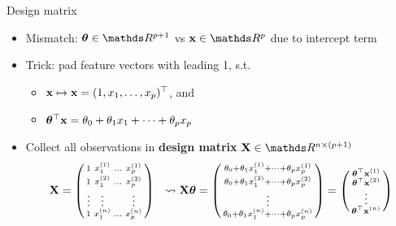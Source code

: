\documentclass[11pt,compress,t,notes=noshow, xcolor=table]{beamer}
\begin{document}

\begin{vbframe}{Design matrix}

\begin{itemize}
    \item Mismatch: $\thetab \in \R^{p + 1}$ vs $\xv \in \R^p$ due to intercept  
    term
    \item Trick: pad feature vectors with leading 1, s.t. 
    \begin{itemize}
        \item $\mathbf{x} \mapsto \mathbf{x} = (1, x_1, \dots, x_p)^\top$, and 
        \item $\bm{\theta}^\top \mathbf{x} = \theta_0 + \theta_1 x_1 + \dots + \theta_p x_p$
    \end{itemize}
    \item Collect all observations in \textbf{design matrix} 
    $\Xmat \in \R^{n \times (p + 1)}$
    $$\mathbf{X} = \left(
    \begin{smallmatrix}
        1 & x^{(1)}_1 & \ldots & x^{(1)}_p \\
        1 & x^{(2)}_1 & \ldots & x^{(2)}_p \\
        \vdots & \vdots & & \vdots \\
        1 & x^{(n)}_1 & \ldots & x^{(n)}_p \\
    \end{smallmatrix}
    \right)
    ~~ \rightsquigarrow \mathbf{X} \bm{\theta} =
    \left(
    \begin{smallmatrix}
        \theta_0 + \theta_1 x_1^{(1)} + \dots + \theta_p x_p^{(1)} \\
        \theta_0 + \theta_1 x_1^{(2)} + \dots + \theta_p x_p^{(2)} \\
        \vdots \\
        \theta_0 + \theta_1 x_1^{(n)} + \dots + \theta_p x_p^{(n)} \\
    \end{smallmatrix}
    \right)
    =
    \left(
    \begin{smallmatrix}
        \bm{\theta}^\top \mathbf{x}^{(1)} \\
        \bm{\theta}^\top \mathbf{x}^{(2)} \\
        \vdots \\
        \bm{\theta}^\top \mathbf{x}^{(n)} \\
    \end{smallmatrix}
    \right)
    $$
\end{itemize}

\end{vbframe}
\end{document}
